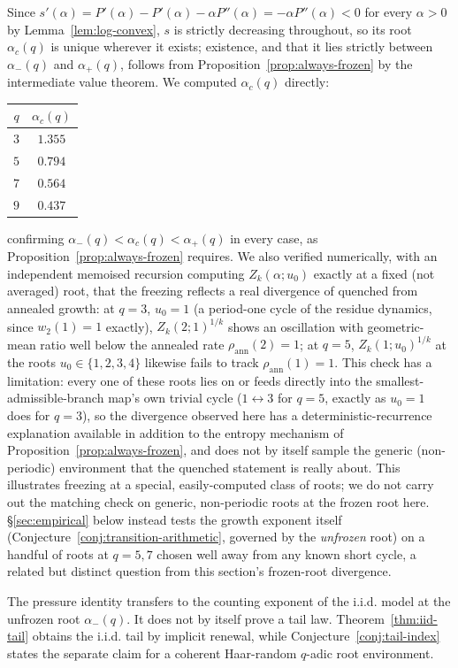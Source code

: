 \documentclass[11pt]{article}
\theoremstyle{remark}
\begin{document}
Since $s'(\alpha)=P'(\alpha)-P'(\alpha)-\alpha P''(\alpha)=-\alpha
P''(\alpha)<0$ for every $\alpha>0$ by Lemma~\ref{lem:log-convex}, $s$
is strictly decreasing throughout, so its root $\alpha_c(q)$ is unique
wherever it exists; existence, and that it lies strictly between
$\alpha_-(q)$ and $\alpha_+(q)$, follows from
Proposition~\ref{prop:always-frozen} by the intermediate value theorem.
We computed $\alpha_c(q)$ directly:
\begin{center}
\begin{tabular}{c|c}
$q$ & $\alpha_c(q)$ \\ \hline
$3$ & $1.355$ \\
$5$ & $0.794$ \\
$7$ & $0.564$ \\
$9$ & $0.437$
\end{tabular}
\end{center}
confirming $\alpha_-(q)<\alpha_c(q)<\alpha_+(q)$ in every case, as
Proposition~\ref{prop:always-frozen} requires. We also verified
numerically, with an independent memoised recursion computing
$Z_k(\alpha;u_0)$ exactly at a fixed (not averaged) root, that the
freezing reflects a real divergence of quenched from annealed growth:
at $q=3$, $u_0=1$ (a period-one cycle of the residue dynamics, since
$w_2(1)=1$ exactly), $Z_k(2;1)^{1/k}$ shows an oscillation with
geometric-mean ratio well below the annealed rate
$\rho_{\mathrm{ann}}(2)=1$; at $q=5$, $Z_k(1;u_0)^{1/k}$ at the roots
$u_0\in\{1,2,3,4\}$ likewise fails to track $\rho_{\mathrm{ann}}(1)=1$.
This check has a limitation: every one of these
roots lies on or feeds directly into the smallest-admissible-branch
map's own trivial cycle ($1\leftrightarrow3$ for $q=5$, exactly as
$u_0=1$ does for $q=3$), so the divergence observed here has a
deterministic-recurrence explanation available in addition to the
entropy mechanism of Proposition~\ref{prop:always-frozen}, and does
not by itself sample the generic (non-periodic) environment that the
quenched statement is really about. This illustrates freezing at a
special, easily-computed class of roots; we do not carry out the
matching check on generic, non-periodic roots at the frozen root here.
\S\ref{sec:empirical} below instead tests the growth exponent itself
(Conjecture~\ref{conj:transition-arithmetic}, governed by the
\emph{unfrozen} root) on a handful of roots at $q=5,7$ chosen well
away from any known short cycle, a related but distinct question from
this section's frozen-root divergence.

The pressure identity transfers to the counting exponent of the i.i.d.
model at the unfrozen root $\alpha_-(q)$. It does not by itself prove a
tail law. Theorem~\ref{thm:iid-tail} obtains the i.i.d. tail by implicit
renewal, while Conjecture~\ref{conj:tail-index} states the separate
claim for a coherent Haar-random $q$-adic root environment.
\end{document}
